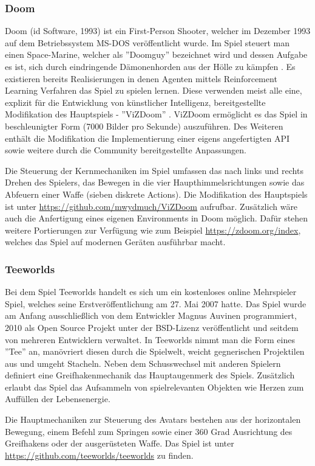 \documentclass[11pt]{scrartcl}
\begin{document}
\subsubsection{Doom}
Doom (id Software, 1993) ist ein First-Person Shooter, welcher im Dezember 1993 auf dem Betriebssystem
MS-DOS veröffentlicht wurde. Im Spiel steuert man einen Space-Marine, welcher als ''Doomguy'' bezeichnet
wird und dessen Aufgabe es ist, sich durch eindringende Dämonenhorden aus der Hölle zu kämpfen
\cite{D1993}. Es existieren bereits Realisierungen in denen Agenten mittels Reinforcement Learning
Verfahren das Spiel zu spielen lernen. Diese verwenden meist alle eine, explizit für die Entwicklung
von künstlicher Intelligenz, bereitgestellte Modifikation des Hauptspiels - ''ViZDoom'' \cite{ViZDoom}. 
ViZDoom ermöglicht es das Spiel in beschleunigter Form (7000 Bilder pro Sekunde) auszuführen. Des
Weiteren enthält die Modifikation die Implementierung einer eigens angefertigten API sowie weitere
durch die Community bereitgestellte Anpassungen.

Die Steuerung der Kernmechaniken im Spiel umfassen das nach links und rechts Drehen des Spielers,
das Bewegen in die vier Haupthimmelsrichtungen sowie das Abfeuern einer Waffe (sieben diskrete
Actions). Die Modifikation des Hauptspiels ist unter \url{https://github.com/mwydmuch/ViZDoom}
aufrufbar. Zusätzlich wäre auch die Anfertigung eines eigenen Environments in Doom möglich. Dafür
stehen weitere Portierungen zur Verfügung wie zum Beispiel \url{https://zdoom.org/index}, welches
das Spiel auf modernen Geräten ausführbar macht. 

\subsubsection{Teeworlds}
Bei dem Spiel Teeworlds handelt es sich um ein kostenloses online Mehrspieler Spiel, welches seine
Erstveröffentlichung am 27. Mai 2007 hatte. Das Spiel wurde am Anfang ausschließlich von dem
Entwickler Magnus Auvinen programmiert, 2010 als Open Source Projekt unter der BSD-Lizenz
veröffentlicht und seitdem von mehreren Entwicklern verwaltet. In Teeworlds nimmt man die Form
eines ''Tee'' an, manövriert diesen durch die Spielwelt, weicht gegnerischen Projektilen aus und
umgeht Stacheln. Neben dem Schusswechsel mit anderen Spielern definiert eine Greifhakenmechanik das
Hauptaugenmerk des Spiels. Zusätzlich erlaubt das Spiel das Aufsammeln von spielrelevanten Objekten
wie Herzen zum Auffüllen der Lebensenergie.

Die Hauptmechaniken zur Steuerung des Avatars bestehen aus der horizontalen Bewegung, einem Befehl
zum Springen sowie einer 360 Grad Ausrichtung des Greifhakens oder der ausgerüsteten Waffe.
Das Spiel ist unter \url{https://github.com/teeworlds/teeworlds} zu finden.
\end{document}
